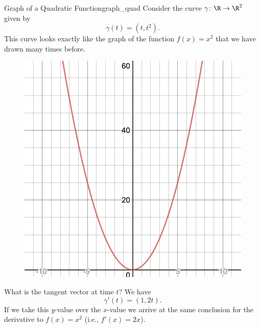         \begin{ex}{Graph of a Quadratic Function}{graph_quad}
        Consider the curve $\gamma\colon \R \to \R^2$ given by
        \[
        \gamma(t)=(t,t^2).
        \]
        This curve looks exactly like the graph of the function $f(x)=x^2$ that we have drawn many times before. 
        \begin{figure}[H]
            \centering
            \includegraphics[width=.4\textwidth]{Figures/quadratic_curve.png}
        \end{figure}
        
        What is the tangent vector at time $t$? We have
        \[
        \gamma'(t)=(1,2t).
        \]
        If we take this $y$-value over the $x$-value we arrive at the same conclusion for the derivative to $f(x)=x^2$ (i.e., $f'(x)=2x$).
        \end{ex}
        
